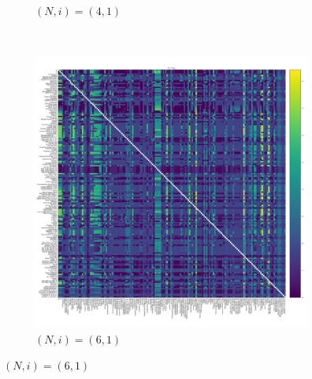 \documentclass{article}
\begin{document}
\begin{figure}[!hbtp]
\begin{subfigure}[t]{.3\textwidth}
        \caption{\((N,i)=(4, 1)\)}
    \end{subfigure}%
    ~
    \begin{subfigure}[t]{.3\textwidth}
        \centering
        \includegraphics[width=.8\textwidth]{../img/fixation_heatmap_6_invade.pdf}
        \caption{\((N,i)=(6, 1)\)}
    \end{subfigure}%


\end{figure}
\end{document}
